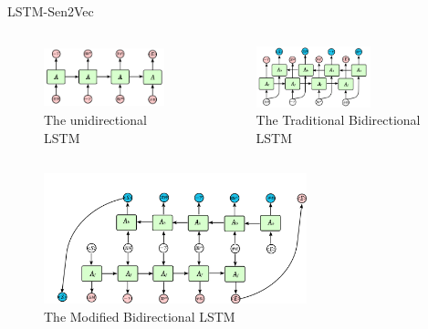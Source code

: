 \documentclass{beamer}
\begin{document}
    \begin{frame}{LSTM-Sen2Vec}
      \begin{columns}
      \begin{column}[t]{0.5\textwidth}
        \begin{figure}
        \includegraphics[width=1.47in,height=0.7in]{unilstm.png}
        \caption{The unidirectional LSTM}
        \end{figure}
      \end{column}

      \begin{column}[t]{0.5\textwidth}
        \begin{figure}
        \includegraphics[width=1.31in,height=0.7in]{bilstm1.png}
        \caption{The Traditional Bidirectional LSTM}
        \end{figure}
      \end{column}

      \end{columns}
      \begin{figure}
        \includegraphics[width=3in,height=1.5in]{bilstm2.png}
        \caption{The Modified Bidirectional LSTM}
        \end{figure}
    \end{frame}
\end{document}
